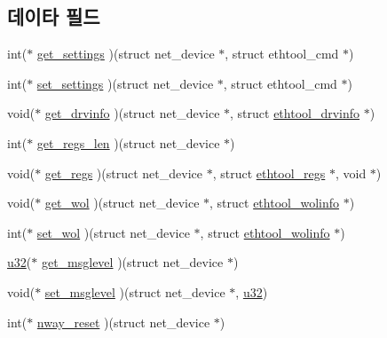 \subsection*{데이타 필드}
\begin{DoxyCompactItemize}
\item 
int($\ast$ \hyperlink{struct__kc__ethtool__ops_ac27195cb98714f8dd9926e72c8c5763d}{get\+\_\+settings} )(struct net\+\_\+device $\ast$, struct ethtool\+\_\+cmd $\ast$)
\item 
int($\ast$ \hyperlink{struct__kc__ethtool__ops_a362b7aebd89cfa9c434326bd391eae60}{set\+\_\+settings} )(struct net\+\_\+device $\ast$, struct ethtool\+\_\+cmd $\ast$)
\item 
void($\ast$ \hyperlink{struct__kc__ethtool__ops_a177848d9f3e535d7a5ae880ae8a3f5b5}{get\+\_\+drvinfo} )(struct net\+\_\+device $\ast$, struct \hyperlink{kcompat_8h_af1c825c7736fa8eb05b5761b7536caeb}{ethtool\+\_\+drvinfo} $\ast$)
\item 
int($\ast$ \hyperlink{struct__kc__ethtool__ops_af5f39c7c9ccc575243f3dd7bff40254c}{get\+\_\+regs\+\_\+len} )(struct net\+\_\+device $\ast$)
\item 
void($\ast$ \hyperlink{struct__kc__ethtool__ops_ad3f1b72e923b9bb0d326e4665053ba5a}{get\+\_\+regs} )(struct net\+\_\+device $\ast$, struct \hyperlink{kcompat_8h_ab64eb40b42f214389fe782ee1b3ddf9c}{ethtool\+\_\+regs} $\ast$, void $\ast$)
\item 
void($\ast$ \hyperlink{struct__kc__ethtool__ops_a9dc2c99cbbe1e7f69d5e2a223703ac57}{get\+\_\+wol} )(struct net\+\_\+device $\ast$, struct \hyperlink{structethtool__wolinfo}{ethtool\+\_\+wolinfo} $\ast$)
\item 
int($\ast$ \hyperlink{struct__kc__ethtool__ops_ad9feedd39d9667395d31fec850c47485}{set\+\_\+wol} )(struct net\+\_\+device $\ast$, struct \hyperlink{structethtool__wolinfo}{ethtool\+\_\+wolinfo} $\ast$)
\item 
\hyperlink{lib_2igb_2e1000__osdep_8h_a64e91c10a0d8fb627e92932050284264}{u32}($\ast$ \hyperlink{struct__kc__ethtool__ops_a7e348d9318763960baa021d8bbd21d7b}{get\+\_\+msglevel} )(struct net\+\_\+device $\ast$)
\item 
void($\ast$ \hyperlink{struct__kc__ethtool__ops_a7cf681088e36dd7c310f5ffbcf834578}{set\+\_\+msglevel} )(struct net\+\_\+device $\ast$, \hyperlink{lib_2igb_2e1000__osdep_8h_a64e91c10a0d8fb627e92932050284264}{u32})
\item 
int($\ast$ \hyperlink{struct__kc__ethtool__ops_aa0df855b8339889a8e8a7e1a7f3881ac}{nway\+\_\+reset} )(struct net\+\_\+device $\ast$)

\end{DoxyCompactItemize}
